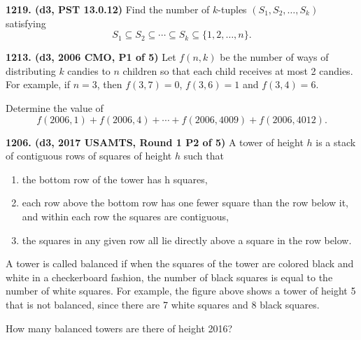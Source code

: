 \documentclass{article}
\begin{document}
        \textbf{1219. (\color{red}d3\color{black}, PST 13.0.12)} Find the number of \(k\)-tuples \((S_1, S_2, \ldots, S_k)\) satisfying \[S_1 \subseteq S_2 \subseteq \cdots \subseteq S_k \subseteq \{ 1,2, \ldots, n\}.\]

        \textbf{1213. (\color{red}d3\color{black}, 2006 CMO, P1 of 5)} Let $f(n, k)$ be the number of ways of distributing $k$ candies to $n$ children so that each child receives at most 2 candies.
        For example, if $n = $3, then $f(3, 7) = 0$, $f(3, 6) = 1$ and $f(3, 4) = 6.$

        Determine the value of
        \[
                f(2006, 1) + f(2006, 4) + \cdots + f(2006, 4009) + f(2006, 4012) .
        \]

        \textbf{1206. (\color{red}d3\color{black}, 2017 USAMTS, Round 1 P2 of 5)} A tower of height $h$ is a stack of contiguous rows of squares of height $h$ such that

        \begin{enumerate}

                \item the bottom row of the tower has h squares,

                \item each row above the bottom row has one fewer square than the row below it, and within each row the squares are contiguous,

                \item the squares in any given row all lie directly above a square in the row below.

        \end{enumerate}



        A tower is called balanced if when the squares of the tower are colored black and white in a checkerboard fashion, the number of black squares is equal to the number of white squares. For example, the figure above shows a tower of height 5 that is not balanced, since there are 7 white squares and 8 black squares.



        How many balanced towers are there of height 2016?
\end{document}
